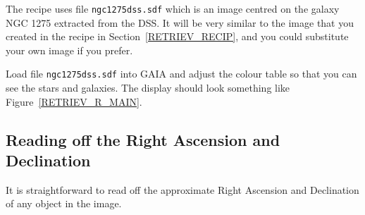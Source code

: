 \documentclass[twoside,11pt]{article}
\renewcommand{\_}{\texttt{\symbol{95}}}
\begin{document}
The recipe uses file {\tt ngc1275dss.sdf} which is an image centred on
the galaxy NGC 1275 extracted from the DSS.  It will be very similar to
the image that you created in the recipe in Section~\ref{RETRIEV_RECIP},
and you could substitute your own image if you prefer.

Load file {\tt ngc1275dss.sdf} into GAIA and adjust the colour table
so that you can see the stars and galaxies.  The display should look
something like Figure~\ref{RETRIEV_R_MAIN}.

\subsection{Reading off the Right Ascension and Declination}

It is straightforward to read off the approximate Right Ascension and
Declination of any object in the image.
\end{document}
